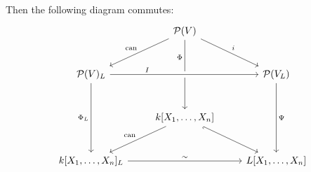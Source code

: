 \begin{proposition}
\begin{enumerate}
      Then the following diagram commutes:
      \begin{equation}
        \label{equaton: commuting prim}
        \begin{tikzcd}[row sep = large]
            {}
          & \mc{P}(V)
            \arrow{dl}[above left]{\can}
            \arrow{dr}[above right]{i}
            \arrow{dd}[near start, left]{\Phi}
          & {}
          \\
            \mc{P}(V)_L
            \arrow[crossing over]{rr}[near start, above]{I}
            \arrow{dd}[left]{\Phi_L}
          & {}
          & \mc{P}(V_L)
            \arrow{dd}[right]{\Psi}
          \\
            {}
          & k[X_1, \dotsc, X_n]
            \arrow{dl}[above left]{\can}
            \arrow[hook']{dr}
          & {}
          \\
            k[X_1, \dotsc, X_n]_L
            \arrow{rr}[above]{\sim}
          & {}
          & L[X_1, \dotsc, X_n]
        \end{tikzcd}
      \end{equation}
  \end{enumerate}
\end{proposition}


